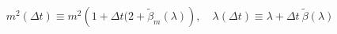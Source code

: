 \begin{equation}
m^2 (\Delta t) \equiv m^2 \left( 1 + \Delta t (2 + \tilde{\beta}_m
(\lambda) \right),\quad
\lambda (\Delta t) \equiv \lambda + \Delta t ~\tilde{\beta} (\lambda)
\end{equation}

